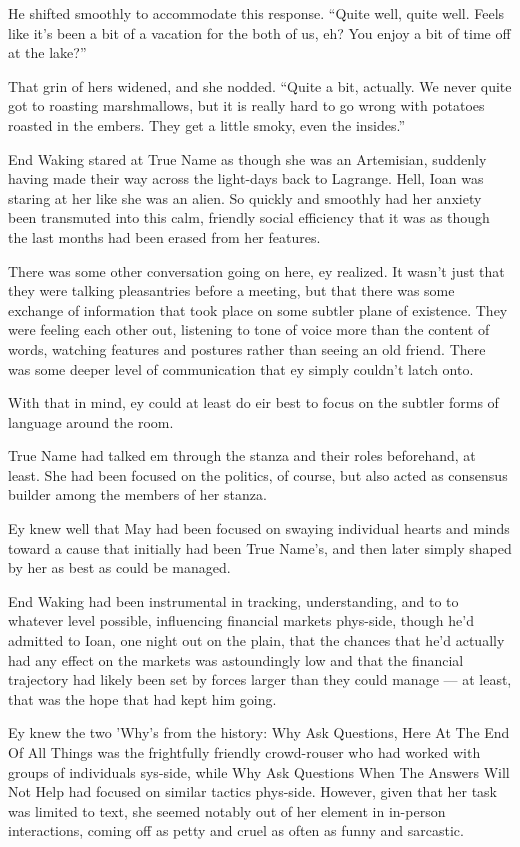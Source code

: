 He shifted smoothly to accommodate this response. ``Quite well, quite well. Feels like it's been a bit of a vacation for the both of us, eh? You enjoy a bit of time off at the lake?''

That grin of hers widened, and she nodded. ``Quite a bit, actually. We never quite got to roasting marshmallows, but it is really hard to go wrong with potatoes roasted in the embers. They get a little smoky, even the insides.''

End Waking stared at True Name as though she was an Artemisian, suddenly having made their way across the light-days back to Lagrange. Hell, Ioan was staring at her like she was an alien. So quickly and smoothly had her anxiety been transmuted into this calm, friendly social efficiency that it was as though the last months had been erased from her features.

There was some other conversation going on here, ey realized. It wasn't just that they were talking pleasantries before a meeting, but that there was some exchange of information that took place on some subtler plane of existence. They were feeling each other out, listening to tone of voice more than the content of words, watching features and postures rather than seeing an old friend. There was some deeper level of communication that ey simply couldn't latch onto.

With that in mind, ey could at least do eir best to focus on the subtler forms of language around the room.

True Name had talked em through the stanza and their roles beforehand, at least. She had been focused on the politics, of course, but also acted as consensus builder among the members of her stanza.

Ey knew well that May had been focused on swaying individual hearts and minds toward a cause that initially had been True Name's, and then later simply shaped by her as best as could be managed.

End Waking had been instrumental in tracking, understanding, and to to whatever level possible, influencing financial markets phys-side, though he'd admitted to Ioan, one night out on the plain, that the chances that he'd actually had any effect on the markets was astoundingly low and that the financial trajectory had likely been set by forces larger than they could manage — at least, that was the hope that had kept him going.

Ey knew the two 'Why's from the history: Why Ask Questions, Here At The End Of All Things was the frightfully friendly crowd-rouser who had worked with groups of individuals sys-side, while Why Ask Questions When The Answers Will Not Help had focused on similar tactics phys-side. However, given that her task was limited to text, she seemed notably out of her element in in-person interactions, coming off as petty and cruel as often as funny and sarcastic.

